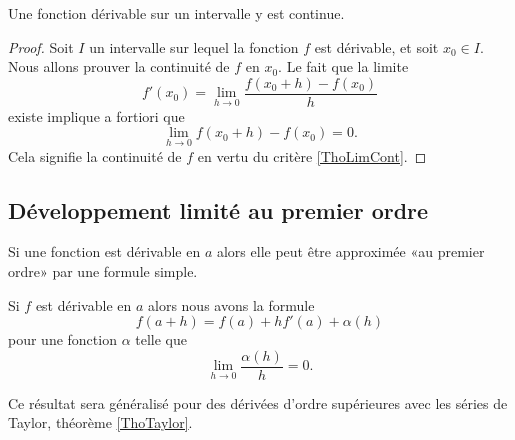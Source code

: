 \begin{proposition} \label{PropSFyxOWF}
    Une fonction dérivable sur un intervalle y est continue.
\end{proposition}

\begin{proof}
    Soit \( I\) un intervalle sur lequel la fonction \( f\) est dérivable, et soit \( x_0\in I\). Nous allons prouver la continuité de \( f\) en \( x_0\). Le fait que la limite
    \begin{equation}
        f'(x_0)=\lim_{h\to 0} \frac{ f(x_0+h)-f(x_0) }{ h }
    \end{equation}
    existe implique a fortiori que 
    \begin{equation}
        \lim_{h\to 0} f(x_0+h)-f(x_0)=0.
    \end{equation}
    Cela signifie la continuité de \( f\) en vertu du critère \ref{ThoLimCont}.
\end{proof}

\subsection{Développement limité au premier ordre}

Si une fonction est dérivable en \( a\) alors elle peut être approximée «au premier ordre» par une formule simple.
\begin{proposition}  \label{PropUTenzfQ}
    Si \( f\) est dérivable en \( a\) alors nous avons la formule
    \begin{equation}
        f(a+h)=f(a)+hf'(a)+\alpha(h)
    \end{equation}
    pour une fonction \( \alpha\) telle que
    \begin{equation}
        \lim_{h\to 0} \frac{ \alpha(h) }{ h }=0.
    \end{equation}
\end{proposition}
Ce résultat sera généralisé pour des dérivées d'ordre supérieures avec les séries de Taylor, théorème \ref{ThoTaylor}.

